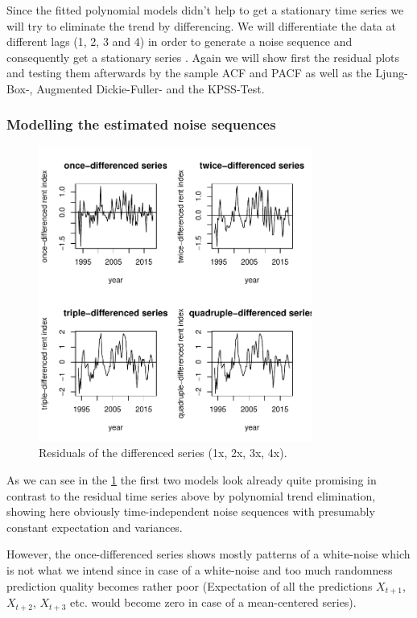 \documentclass[11pt,a4paper]{article}
\begin{document}
Since the fitted polynomial models didn't help to get a stationary time series we will try to eliminate the trend by differencing.
We will differentiate the data at different lags (1, 2, 3 and 4) in order to generate a noise sequence and consequently get a stationary series \citep[p.~35]{bd02}.
Again we will show first the residual plots and testing them afterwards by the sample ACF and PACF as well as the Ljung-Box-, Augmented Dickie-Fuller- and the KPSS-Test.


\subsubsection{Modelling the estimated noise sequences}

\begin{figure}
    \centering
    \includegraphics[width=0.8\textwidth]{resid_diff_all}
    \caption{Residuals of the differenced series (1x, 2x, 3x, 4x).}
    \label{fig:resid_diff_all}
\end{figure}

As we can see in the \cref{fig:resid_diff_all} the first two models look already quite promising in contrast to the residual time series above by polynomial trend elimination, showing here obviously time-independent noise sequences with presumably constant expectation and variances.

However, the once-differenced series shows mostly patterns of a white-noise which is not what we intend since in case of a white-noise and too much randomness prediction quality becomes rather poor (Expectation of all the predictions $X_{t+1}$, $X_{t+2}$, $X_{t+3}$ etc. would become zero in case of a mean-centered series).
\end{document}
